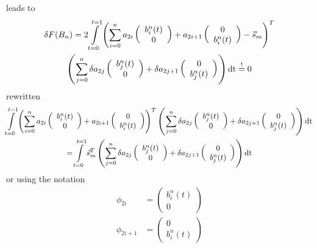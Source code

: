 leads to
\begin{multline}
\delta F(B_n)=2\int\limits_{t=0}^{t=1} \left(\sum\limits_{i=0}^n  a_{2i} \left(
\begin{array}{c}
b_i^n (t)\\0
\end{array}
\right)
+ a_{2i+1}
\left(
\begin{array}{c}
0\\b_i^n (t) 
\end{array}
\right)-\vec{s}_m\right)^T
\\
\left(\sum\limits_{j=0}^n \delta a_{2j} \left(
\begin{array}{c}
b_j^n (t)\\0
\end{array}
\right)
+ \delta a_{2j+1}
\left(
\begin{array}{c}
0\\ b_j^n (t) 
\end{array}
\right)\right)\dt \overset{!}{=}0
\end{multline}
rewritten
\begin{multline}
\int\limits_{t=0}^{t=1} \left(\sum\limits_{i=0}^n  a_{2i}
\left(
\begin{array}{c}
b_i^n (t)\\0
\end{array}
\right)
+  a_{2i+1}
\left(
\begin{array}{c}
0\\b_i^n (t)
\end{array}
\right)\right)^T
\left(\sum\limits_{j=0}^n 
\delta a_{2j} \left(
\begin{array}{c}
b_j^n (t)\\0
\end{array}
\right)
+ \delta a_{2j+1}
\left(
\begin{array}{c}
0\\ b_j^n (t) 
\end{array}
\right)\right)\dt 
\\
=
\int\limits_{t=0}^{t=1}\vec{s}_m^T \left(\sum\limits_{j=0}^n \delta a_{2j} \left(
\begin{array}{c}
b_j^n (t)\\0
\end{array}
\right)
+ \delta a_{2j+1}
\left(
\begin{array}{c}
0\\ b_j^n (t) 
\end{array}
\right)\right)\dt
\end{multline}
or using the notation
\begin{align}
\phi_{2i}&=
\left(
\begin{array}{c}
b_i^n (t)\\0
\end{array}
\right)
\\
\phi_{2i+1}&=
\left(
\begin{array}{c}
0\\b_i^n (t)
\end{array}
\right)
\end{align}
